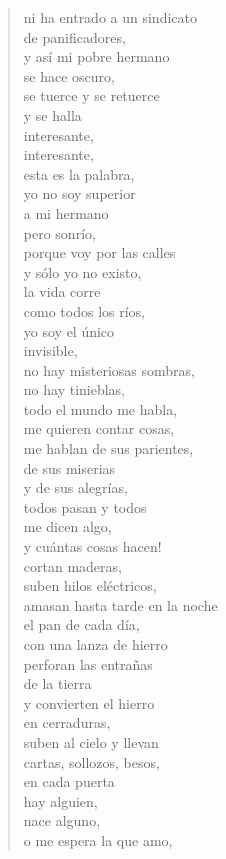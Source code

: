 \documentclass[12pt]{article}
\begin{document}
\begin{verse}
{ni ha entrado a un sindicato\\
de panificadores,\\
y así mi pobre hermano\\
se hace oscuro,\\
se tuerce y se retuerce\\
y se halla\\
interesante,\\
interesante,\\
esta es la palabra,\\
yo no soy superior\\
a mi hermano\\
pero sonrío,\\
porque voy por las calles\\
y sólo yo no existo,\\
la vida corre\\
como todos los ríos,\\
yo soy el único\\
invisible,\\
no hay misteriosas sombras,\\
no hay tinieblas,\\
todo el mundo me habla,\\
me quieren contar cosas,\\
me hablan de sus parientes,\\
de sus miserias\\
y de sus alegrías,\\
todos pasan y todos\\
me dicen algo,\\
y cuántas cosas hacen!\\
cortan maderas,\\
suben hilos eléctricos,\\
amasan hasta tarde en la noche\\
el pan de cada día,\\
con una lanza de hierro\\
perforan las entrañas\\
de la tierra\\
y convierten el hierro\\
en cerraduras,\\
suben al cielo y llevan\\
cartas, sollozos, besos,\\
en cada puerta\\
hay alguien,\\
nace alguno,\\
o me espera la que amo,\\
}
\end{verse}
\end{document}
